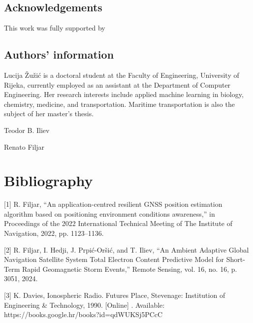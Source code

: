 \documentclass[sn-mathphys-num]{sn-jnl}%
\begin{document}
\subsection{Acknowledgements}

This work was fully supported by

\subsection{Authors' information}

Lucija Žužić is a doctoral student at the Faculty of Engineering, University of Rijeka, currently employed as an assistant at the Department of Computer Engineering. Her research interests include applied machine learning in biology, chemistry, medicine, and transportation. Maritime transportation is also the subject of her master's thesis.

Teodor B. Iliev

Renato Filjar


\section{Bibliography}
[1] R. Filjar, “An application-centred resilient GNSS position estimation algorithm based on positioning environment conditions awareness,” in Proceedings of the 2022 International Technical Meeting of The Institute of Navigation, 2022, pp. 1123–1136.

[2] R. Filjar, I. Hedji, J. Prpić-Oršić, and T. Iliev, “An Ambient Adaptive Global Navigation Satellite System Total Electron Content Predictive Model for Short-Term Rapid Geomagnetic Storm Events,” Remote Sensing, vol. 16, no. 16, p. 3051, 2024.

[3] K. Davies, Ionospheric Radio. Futures Place, Stevenage: Institution of Engineering & Technology, 1990. [Online] . Available: https://books.google.hr/books?id=qdWUKSj5PCcC
\end{document}
